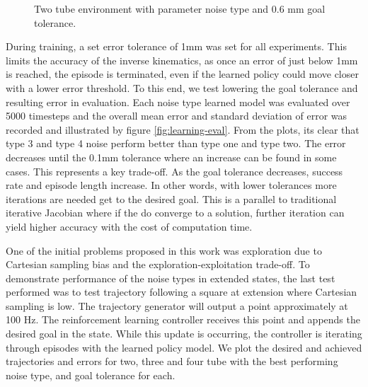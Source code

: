 \begin{figure}
    \caption{Two tube environment with parameter noise type and 0.6 mm goal tolerance.}
    \label{fig:two-tube-pcl}
\end{figure}

During training, a set error tolerance of 1mm was set for all experiments. This limits the accuracy of the inverse kinematics, as once an error of just below 1mm is reached, the episode is terminated, even if the learned policy could move closer with a lower error threshold. To this end, we test lowering the goal tolerance and resulting error in evaluation. Each noise type learned model was evaluated over 5000 timesteps and the overall mean error and standard deviation of error was recorded and illustrated by figure \ref{fig:learning-eval}. From the plots, its clear that type 3 and type 4 noise perform better than type one and type two. The error decreases until the 0.1mm tolerance where an increase can be found in some cases. This represents a key trade-off. As the goal tolerance decreases, success rate and episode length increase. In other words, with lower tolerances more iterations are needed get to the desired goal. This is a parallel to traditional iterative Jacobian where if the do converge to a solution, further iteration can yield higher accuracy with the cost of computation time.

One of the initial problems proposed in this work was exploration due to Cartesian sampling bias and the exploration-exploitation trade-off. To demonstrate performance of the noise types in extended states, the last test performed was to test trajectory following a square at extension where Cartesian sampling is low. The trajectory generator will output a point approximately at 100 Hz. The reinforcement learning controller receives this point and appends the desired goal in the state. While this update is occurring, the controller is iterating through episodes with the learned policy model. We plot the desired and achieved trajectories and errors for two, three and four tube with the best performing noise type, and goal tolerance for each.

